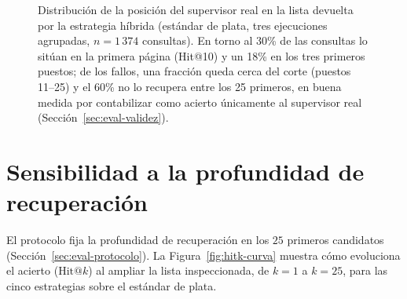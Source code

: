 \begin{figure}[htbp]
  \centering
  \caption[Distribución de la posición del supervisor real]{Distribución de la posición del supervisor real en la lista devuelta por la estrategia híbrida (estándar de plata, tres ejecuciones agrupadas, $n=1\,374$ consultas). En torno al 30\% de las consultas lo sitúan en la primera página (\mbox{Hit@10}) y un 18\% en los tres primeros puestos; de los fallos, una fracción queda cerca del corte (puestos 11--25) y el 60\% no lo recupera entre los 25 primeros, en buena medida por contabilizar como acierto únicamente al supervisor real (Sección~\ref{sec:eval-validez}).}
  \label{fig:rango-director}
\end{figure}

\section{Sensibilidad a la profundidad de recuperación}
\label{sec:annex-profundidad}

El protocolo fija la profundidad de recuperación en los $25$ primeros candidatos (Sección~\ref{sec:eval-protocolo}).
La Figura~\ref{fig:hitk-curva} muestra cómo evoluciona el acierto ($\mathrm{Hit@}k$) al ampliar la lista inspeccionada, de $k=1$ a $k=25$, para las cinco estrategias sobre el estándar de plata.

